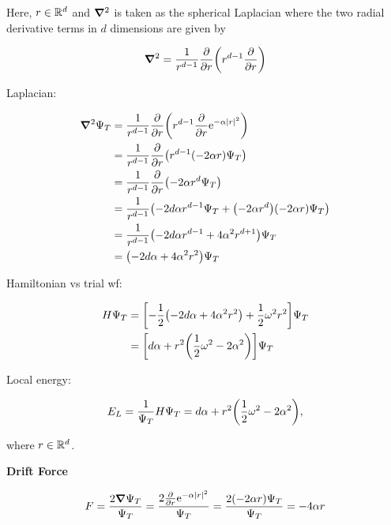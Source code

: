 Here, $r \in \mathbb{R}^d$ and $\grad^2$ is taken as the spherical Laplacian where the two radial derivative terms in $d$ dimensions are given by

\begin{equation*}
    \grad^2 = \frac{1}{r^{d-1}} \pdv{r} \qty(r^{d-1} \pdv{r})
\end{equation*}

Laplacian: 

\begin{align*}
    \grad^2 \Psi_T &= \frac{1}{r^{d-1}} \pdv{r} \qty(r^{d-1} \pdv{r} \mathrm{e}^{-\alpha \abs{r}^2})
    \\
    &= \frac{1}{r^{d-1}} \pdv{r} \qty(r^{d-1} \qty(- 2 \alpha r) \Psi_T)
    \\
    &= \frac{1}{r^{d-1}} \pdv{r} \qty(- 2 \alpha r^d \Psi_T)
    \\
    &= \frac{1}{r^{d-1}} \qty(-2d\alpha r^{d-1} \Psi_T + \qty(- 2 \alpha r^d)\qty(- 2 \alpha r) \Psi_T )
    \\
    &= \frac{1}{r^{d-1}} \qty(-2d \alpha r^{d-1} + 4 \alpha^2 r^{d+1}) \Psi_T
    \\
    &= \qty(-2d \alpha + 4 \alpha^2 r^2) \Psi_T
\end{align*}

Hamiltonian vs trial wf: 

\begin{align*}
    H \Psi_T &= \qty[ - \frac{1}{2} \qty(-2d \alpha + 4 \alpha^2 r^2) + \frac{1}{2} \omega^2 r^2] \Psi_T
    \\
    &= \qty[ d \alpha + r^2 \qty(\frac{1}{2} \omega^2 - 2 \alpha^2) ] \Psi_T
\end{align*}

Local energy: 

\begin{equation*}
    E_L = \frac{1}{\Psi_T} H \Psi_T = d \alpha + r^2 \qty(\frac{1}{2} \omega^2 - 2 \alpha^2),
\end{equation*}

where $r \in \mathbb{R}^d$.

\textbf{Drift Force}

\begin{equation*}
    F = \frac{2 \grad \Psi_T}{\Psi_T} = \frac{2 \pdv{r} \mathrm{e}^{-\alpha \abs{r}^2}}{\Psi_T} = \frac{2 \qty(-2 \alpha r) \Psi_T}{\Psi_T} = - 4 \alpha r
\end{equation*}


